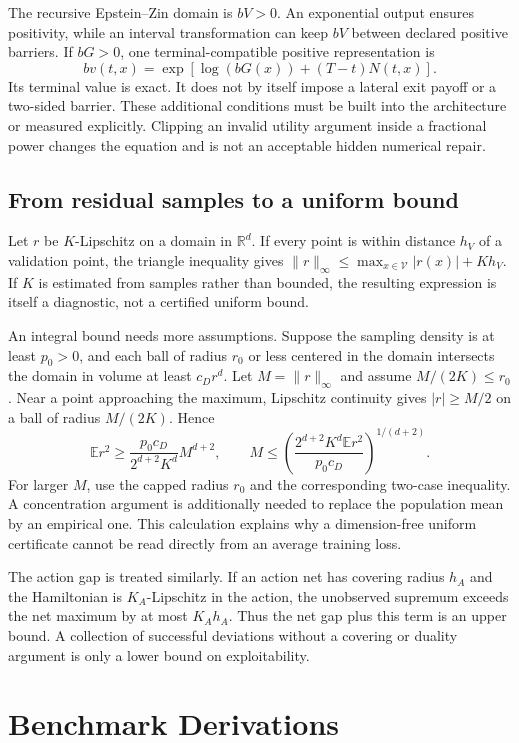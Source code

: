 \documentclass[ecta,draft]{econsocart}
\newcommand{\E}{\mathbb E}
\newcommand{\R}{\mathbb R}
\begin{document}
The recursive Epstein--Zin domain is $bV>0$. An exponential output ensures positivity, while an interval transformation can keep $bV$ between declared positive barriers. If $bG>0$, one terminal-compatible positive representation is
\[
 bv(t,x)=\exp\left[\log(bG(x))+(T-t)N(t,x)\right].
\]
Its terminal value is exact. It does not by itself impose a lateral exit payoff or a two-sided barrier. These additional conditions must be built into the architecture or measured explicitly. Clipping an invalid utility argument inside a fractional power changes the equation and is not an acceptable hidden numerical repair.

\subsection{From residual samples to a uniform bound}
Let $r$ be $K$-Lipschitz on a domain in $\R^d$. If every point is within distance $h_V$ of a validation point, the triangle inequality gives $\|r\|_\infty\leq\max_{x\in\mathcal V}|r(x)|+Kh_V$. If $K$ is estimated from samples rather than bounded, the resulting expression is itself a diagnostic, not a certified uniform bound.

An integral bound needs more assumptions. Suppose the sampling density is at least $p_0>0$, and each ball of radius $r_0$ or less centered in the domain intersects the domain in volume at least $c_Dr^d$. Let $M=\|r\|_\infty$ and assume $M/(2K)\leq r_0$. Near a point approaching the maximum, Lipschitz continuity gives $|r|\geq M/2$ on a ball of radius $M/(2K)$. Hence
\[
 \E r^2\geq\frac{p_0c_D}{2^{d+2}K^d}M^{d+2},\qquad
 M\leq\left(\frac{2^{d+2}K^d\E r^2}{p_0c_D}\right)^{1/(d+2)}.
\]
For larger $M$, use the capped radius $r_0$ and the corresponding two-case inequality. A concentration argument is additionally needed to replace the population mean by an empirical one. This calculation explains why a dimension-free uniform certificate cannot be read directly from an average training loss.

The action gap is treated similarly. If an action net has covering radius $h_A$ and the Hamiltonian is $K_A$-Lipschitz in the action, the unobserved supremum exceeds the net maximum by at most $K_Ah_A$. Thus the net gap plus this term is an upper bound. A collection of successful deviations without a covering or duality argument is only a lower bound on exploitability.

\section{Benchmark Derivations}
\end{document}
